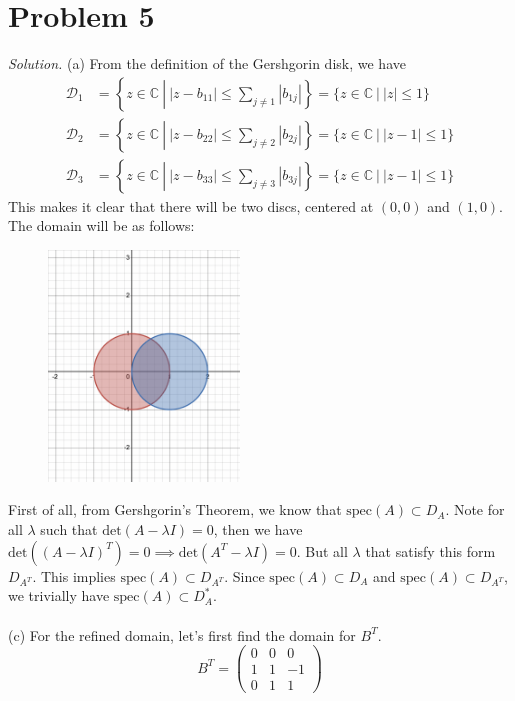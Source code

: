 \documentclass{article}
\begin{document}
\section*{Problem 5}
\emph{Solution. }(a) From the definition of the Gershgorin disk, we have
\begin{align*}
    \mathcal{D}_{1} &= \left\{z \in \mathbb{C} \ \left| \ |z - b_{11}| \leq \sum_{j\neq 1}|b_{1j}|\right\} = \{z \in \mathbb{C} \ | \ |z| \leq 1\}\\
    \mathcal{D}_{2} &= \left\{z \in \mathbb{C} \ \left| \ |z - b_{22}| \leq \sum_{j\neq 2}|b_{2j}|\right\} = \{z \in \mathbb{C} \ | \ |z - 1| \leq 1\}\\
    \mathcal{D}_{3} &= \left\{z \in \mathbb{C} \ \left| \ |z - b_{33}| \leq \sum_{j\neq 3}|b_{3j}|\right\} = \{z \in \mathbb{C} \ | \ |z - 1| \leq 1\}
\end{align*}
This makes it clear that there will be two discs, centered at $(0,0)$ and $(1, 0)$. The domain will be as follows:
\begin{figure}[htp]
    \centering
    \includegraphics[width=2in]{img1.png}
    \label{fig:galaxy}
\end{figure}
\newpage
{} First of all, from Gershgorin's Theorem, we know that $\text{spec}(A) \subset D_{A}$. Note for all $\lambda$ such that $\text{det}(A - \lambda I) =0$, then we have $\text{det}((A - \lambda I)^{T}) = 0 \implies \text{det}(A^{T} - \lambda I) = 0$. But all $\lambda$ that satisfy this form $D_{A^{T}}$. This implies $\text{spec}(A) \subset D_{A^{T}}$. Since $\text{spec}(A) \subset D_{A}$ and $\text{spec}(A) \subset D_{A^{T}}$, we trivially have $\text{spec}(A) \subset D_{A}^{*}$. \\\\
(c) For the refined domain, let's first find the domain for $B^{T}$. 
\begin{equation*}
    B^{T} = \begin{pmatrix}
        0 &0& 0\\
        1 &1 &-1\\
        0 &1 &1
    \end{pmatrix}
\end{equation*}
\end{document}
